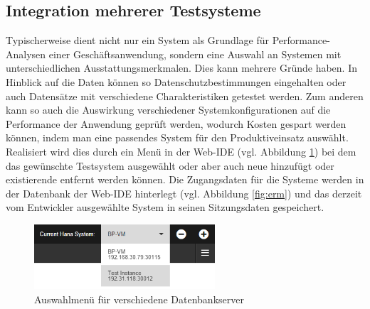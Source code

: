 \subsection{Integration mehrerer Testsysteme}
Typischerweise dient nicht nur ein System als Grundlage für Performance-Analysen einer Geschäftsanwendung, sondern eine Auswahl an Systemen mit unterschiedlichen Ausstattungsmerkmalen.
Dies kann mehrere Gründe haben.
In Hinblick auf die Daten können so Datenschutzbestimmungen eingehalten oder auch Datensätze mit verschiedene Charakteristiken getestet werden.
Zum anderen kann so auch die Auswirkung verschiedener Systemkonfigurationen auf die Performance der Anwendung geprüft werden, wodurch Kosten gespart werden können, indem man eine passendes System für den Produktiveinsatz auswählt.
Realisiert wird dies durch ein Menü in der Web-IDE (vgl. Abbildung \ref{fig:hanainstances}) bei dem das gewünschte Testsystem ausgewählt oder aber auch neue hinzufügt oder existierende entfernt werden können.
Die Zugangsdaten für die Systeme werden in der Datenbank der Web-IDE hinterlegt (vgl. Abbildung \ref{fig:erm}) und das derzeit vom Entwickler ausgewählte System in seinen Sitzungsdaten gespeichert.
\begin{figure}[ht]
	\centering
  \includegraphics[width=0.6\textwidth]{figures/hana-instances.png}
	\caption{Auswahlmenü für verschiedene Datenbankserver}
	\label{fig:hanainstances}
\end{figure}


